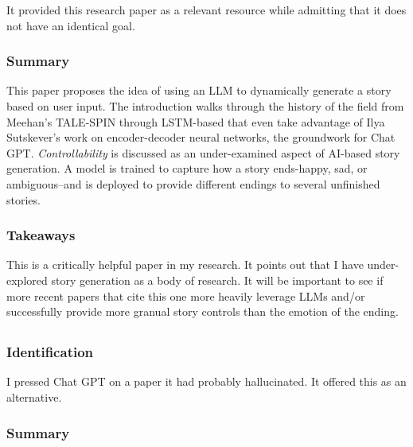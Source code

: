 \documentclass[
	letterpaper, %
]{jdf}
\begin{document}
It provided this research paper as a relevant resource while admitting that it does not have an identical goal.

\subsubsection{Summary}
This paper proposes the idea of using an LLM to dynamically generate a story based on user input. The introduction walks through the history of the field from Meehan's TALE-SPIN through LSTM-based that even take advantage of Ilya Sutskever's work on encoder-decoder neural networks, the groundwork for Chat GPT. \textit{Controllability} is discussed as an under-examined aspect of AI-based story generation. A model is trained to capture how a story ends-happy, sad, or ambiguous–and is deployed to provide different endings to several unfinished stories.

\subsubsection{Takeaways}
This is a critically helpful paper in my research. It points out that I have under-explored story generation as a body of research. It will be important to see if more recent papers that cite this one more heavily leverage LLMs and/or successfully provide more granual story controls than the emotion of the ending.

\subsection{}
\subsubsection{Identification}
I pressed Chat GPT on a paper it had probably hallucinated. It offered this as an alternative.

\subsubsection{Summary}
\end{document}
